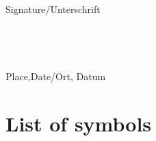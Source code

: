 \documentclass[a4paper,twoside,openright]{book}
\begin{document}
\noindent
Signature/Unterschrift
${}$\\
${}$\\
${}$\\
${}$\\
${}$\\
Place,Date/Ort, Datum











\newpage

\newenvironment{spmatrix}[1]
 {\def\mysubscript{#1}\mathop\bgroup\begin{pmatrix}}
 {\end{pmatrix}\egroup_{\textstyle\mathstrut\mysubscript}}

\section{List of symbols} \label{symbol_list}
\end{document}
